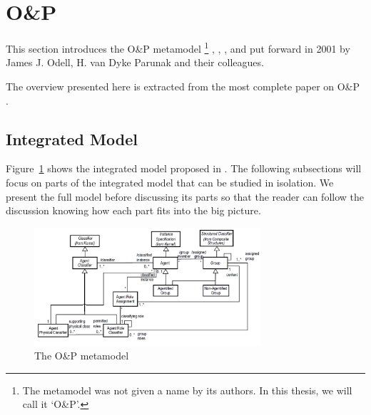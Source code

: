 
\section{O\&P}

This section introduces the O\&P metamodel
\footnote{The metamodel was not given a name by its authors. In this thesis, we will call it `O\&P'.}
\cite{Odell01}, \cite{Parunak02}, \cite{Odell03b}, \cite{Odell04b} and \cite{Odell05}
put forward in 2001 by James J. Odell, H. van Dyke Parunak and their colleagues.

The overview presented here is extracted from the most complete paper on O\&P \cite{Odell05}.

\subsection{Integrated Model}

Figure~\ref{figure:onp-metamodel} shows the integrated model proposed in \cite{Odell05}.
The following subsections will focus on parts of the integrated model that can be studied in isolation.
We present the full model before discussing its parts so that the reader can follow the discussion knowing how each part fits into the big picture.

\begin{figure}[ht]
	\centering
	\includegraphics[width=0.75\textwidth]{images/onp/onp-metamodel.png}
	\caption{The O\&P metamodel}
	\label{figure:onp-metamodel}
\end{figure}

